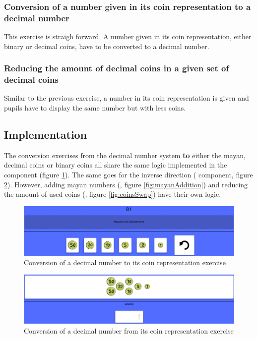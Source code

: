 \subsubsection*{Conversion of a number given in its coin representation to a decimal number}

This exercise is straigh forward. A number given in its coin representation, either binary or decimal coins, have to be converted to a decimal number. 

\subsubsection*{Reducing the amount of decimal coins in a given set of decimal coins}

Similar to the previous exercise, a number in its coin representation is given and pupils have to display the same number but with less coins.

\subsection{Implementation}

The conversion exercises from the decimal number system \textbf{to} either the mayan, decimal coins or binary coins all share the same logic implemented in the  component (figure \ref{fig:coinsTo}).
The same goes for the inverse direction ( component, figure \ref{fig:coinsFrom}).
However, adding mayan numbers (, figure \ref{fig:mayanAddition}) and reducing the amount of used coins (, figure \ref{fig:coinsSwap}) have their own logic. 

\begin{figure} 
  \centering
  \includegraphics[width=1.0 \columnwidth]{figures/coins_to.png}
  \caption{Conversion of a decimal number to its coin representation exercise} 
  \label{fig:coinsTo} 
\end{figure}

\begin{figure} 
  \centering
  \includegraphics[width=1.0 \columnwidth]{figures/coins_from.png}
  \caption{Conversion of a decimal number from its coin representation exercise} 
  \label{fig:coinsFrom} 
\end{figure}

